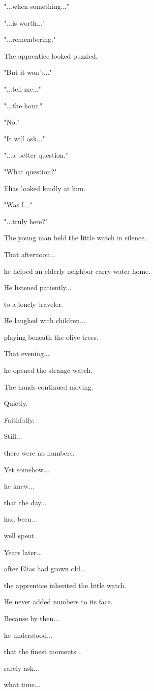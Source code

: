 \documentclass[12pt,openany]{book}
\begin{document}
"...when something..."

"...is worth..."

"...remembering."

The apprentice looked puzzled.

"But it won't..."

"...tell me..."

"...the hour."

"No."

"It will ask..."

"...a better question."

"What question?"

Elias looked kindly at him.

"Was I..."

"...truly here?"

The young man held the little watch in silence.

That afternoon...

he helped an elderly neighbor carry water home.

He listened patiently...

to a lonely traveler.

He laughed with children...

playing beneath the olive trees.

That evening...

he opened the strange watch.

The hands continued moving.

Quietly.

Faithfully.

Still...

there were no numbers.

Yet somehow...

he knew...

that the day...

had been...

well spent.

Years later...

after Elias had grown old...

the apprentice inherited the little watch.

He never added numbers to its face.

Because by then...

he understood...

that the finest moments...

rarely ask...

what time...
\end{document}
